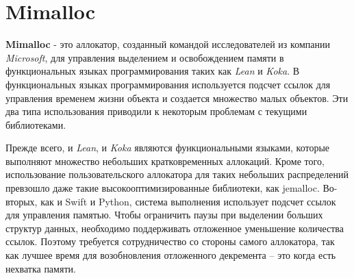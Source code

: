 \section{Mimalloc}

\textbf{Mimalloc} - это аллокатор, созданный командой исследователей из компании \textit{Microsoft}, для управления выделением и освобождением памяти в функциональных языках программирования таких как \textit{Lean} и \textit{Koka}. В функциональных языках программирования используется подсчет ссылок для управления временем жизни объекта и  создается множество малых объектов. Эти два типа использования приводили к некоторым проблемам с текущими библиотеками.

Прежде всего, и \textit{Lean}, и \textit{Koka} являются функциональными языками, которые выполняют множество небольших кратковременных аллокаций. Кроме того, использование пользовательского аллокатора для таких небольших распределений превзошло даже такие высокооптимизированные библиотеки, как jemalloc. Во-вторых, как и Swift и Python, система выполнения использует подсчет ссылок для управления памятью. Чтобы ограничить паузы при выделении больших структур данных, необходимо поддерживать отложенное уменьшение количества ссылок. Поэтому требуется сотрудничество со стороны самого аллокатора, так как лучшее время для возобновления отложенного декремента – это когда есть нехватка памяти.

